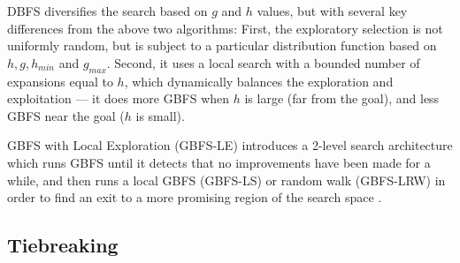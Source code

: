 DBFS \cite{imai2011novel} diversifies the
search based on $g$ and $h$ values, but with several key differences from
the above two algorithms: First, the exploratory selection is not uniformly
random, but is subject to a particular distribution function based on 
$h, g, h_{min}$ and $g_{max}$. Second, it uses a local search with
a bounded number of expansions equal to $h$, which dynamically balances the exploration
and exploitation --- it does more GBFS when $h$ is large (far
from the goal), and less GBFS near the goal ($h$ is small).

GBFS with Local Exploration (GBFS-LE) introduces a 2-level search architecture which runs
GBFS until it detects that no improvements have been made for a while, and
then runs a local GBFS (GBFS-LS) or random walk (GBFS-LRW)
in order to find an exit to a more promising region of the search space \cite{XieH14gbfsle}.

\subsection{Tiebreaking}

% 
% 

